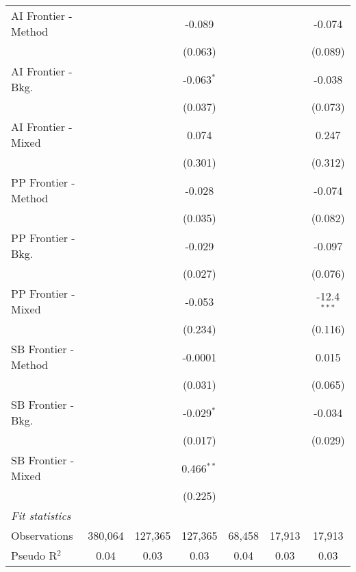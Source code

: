 \begin{tabular}{lcccccc}
   AI Frontier - Method &         &         & -0.089       &         &         & -0.074\\   
                        &         &         & (0.063)      &         &         & (0.089)\\   
   AI Frontier - Bkg.   &         &         & -0.063$^{*}$ &         &         & -0.038\\   
                        &         &         & (0.037)      &         &         & (0.073)\\   
   AI Frontier - Mixed  &         &         & 0.074        &         &         & 0.247\\   
                        &         &         & (0.301)      &         &         & (0.312)\\   
   PP Frontier - Method &         &         & -0.028       &         &         & -0.074\\   
                        &         &         & (0.035)      &         &         & (0.082)\\   
   PP Frontier - Bkg.   &         &         & -0.029       &         &         & -0.097\\   
                        &         &         & (0.027)      &         &         & (0.076)\\   
   PP Frontier - Mixed  &         &         & -0.053       &         &         & -12.4$^{***}$\\   
                        &         &         & (0.234)      &         &         & (0.116)\\   
   SB Frontier - Method &         &         & -0.0001      &         &         & 0.015\\   
                        &         &         & (0.031)      &         &         & (0.065)\\   
   SB Frontier - Bkg.   &         &         & -0.029$^{*}$ &         &         & -0.034\\   
                        &         &         & (0.017)      &         &         & (0.029)\\   
   SB Frontier - Mixed  &         &         & 0.466$^{**}$ &         &         &   \\   
                        &         &         & (0.225)      &         &         &   \\   
   \midrule
   \emph{Fit statistics}\\
   Observations         & 380,064 & 127,365 & 127,365      & 68,458  & 17,913  & 17,913\\  
   Pseudo R$^2$         & 0.04    & 0.03    & 0.03         & 0.04    & 0.03    & 0.03\\  
   

\end{tabular}
